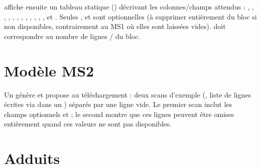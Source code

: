 \documentclass[letterpaper,10pt,english]{sphinxmanual}
\begin{document}
\sphinxAtStartPar
{} affiche ensuite un tableau statique () décrivant
les colonnes/champs attendus : , , ,
, , , ,
, , , , ,
 et . Seules ,  et  sont
optionnelles (à supprimer entièrement du bloc si non disponibles, contrairement
au MS1 où elles sont laissées vides).  doit correspondre au
nombre de lignes / du bloc.


\section{Modèle MS2}
\label{\detokenize{4_Resources:modele-ms2}}
\sphinxAtStartPar
Un  génère et propose au téléchargement
 : deux scans d’exemple (,
liste de lignes écrites via  dans un ) séparés
par une ligne vide. Le premier scan inclut les champs optionnels  et
 ; le second montre que ces lignes peuvent être omises entièrement
quand ces valeurs ne sont pas disponibles.


\section{Adduits}
\label{\detokenize{4_Resources:adduits}}
\end{document}
